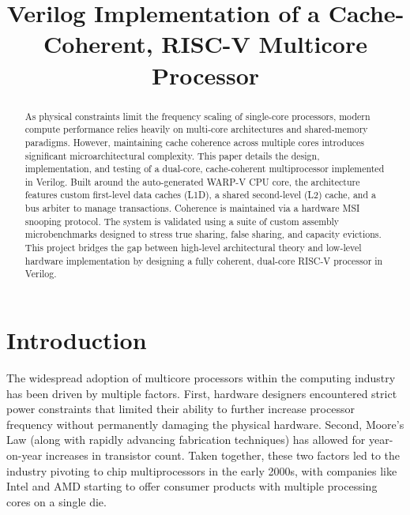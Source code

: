 \documentclass[10pt, compsoc]{IEEEtran}
\begin{document}
\title{Verilog Implementation of a Cache-Coherent, RISC-V Multicore Processor}





\author{

}







\maketitle

\begin{abstract}

As physical constraints limit the frequency scaling of single-core processors, modern compute performance relies heavily on multi-core architectures and shared-memory paradigms. However, maintaining cache coherence across multiple cores introduces significant microarchitectural complexity. This paper details the design, implementation, and testing of a dual-core, cache-coherent multiprocessor implemented in Verilog. Built around the auto-generated WARP-V CPU core, the architecture features custom first-level data caches (L1D), a shared second-level (L2) cache, and a bus arbiter to manage transactions. Coherence is maintained via a hardware MSI snooping protocol. The system is validated using a suite of custom assembly microbenchmarks designed to stress true sharing, false sharing, and capacity evictions. This project bridges the gap between high-level architectural theory and low-level hardware implementation by designing a fully coherent, dual-core RISC-V processor in Verilog. 

\end{abstract}





\section{Introduction}

The widespread adoption of multicore processors within the computing industry has been driven by multiple factors. First, hardware designers encountered strict power constraints that limited their ability to further increase processor frequency without permanently damaging the physical hardware. Second, Moore's Law (along with rapidly advancing fabrication techniques) has allowed for year-on-year increases in transistor count. Taken together, these two factors led to the industry pivoting to chip multiprocessors in the early 2000s, with companies like Intel and AMD starting to offer consumer products with multiple processing cores on a single die. 
\end{document}
